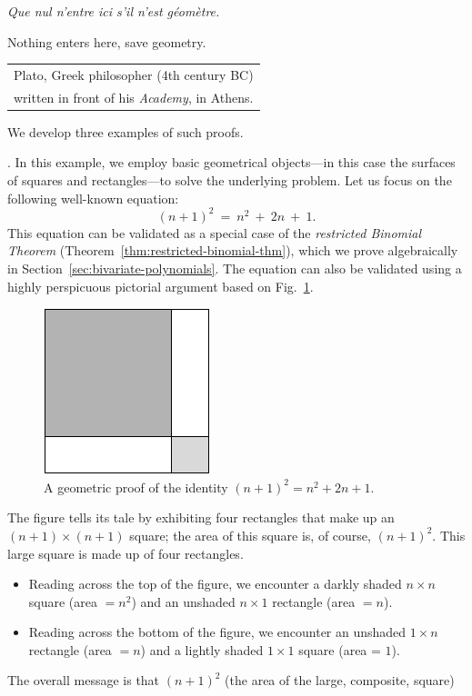 \medskip


{\it Que nul n'entre ici s'il n'est g\'eom\`etre.}

Nothing enters here, save geometry.

\hfill {\small \begin{tabular}{l}
Plato, Greek philosopher (4th century BC) \\
written in front of his \textit{Academy}, in Athens. 
\end{tabular} }

\medskip

\noindent
We develop three examples of such proofs.

\medskip

.
In this example, we employ basic geometrical objects---in this case the surfaces of squares and rectangles---to solve the underlying problem.  Let us focus on the following well-known equation:
\begin{equation}
(n+1)^2 \ = \ n^2 \ + \ 2n \ + \ 1.
\end{equation}
This equation can be validated as a special case of the {\em restricted Binomial Theorem}
(Theorem~\ref{thm:restricted-binomial-thm}), which we prove algebraically in Section~\ref{sec:bivariate-polynomials}.  The equation can also be validated using a highly perspicuous pictorial argument based on Fig.~\ref{fig:proofa2plusb2}.
\begin{figure}[ht]
\begin{center}
       \includegraphics[scale=0.4]{FiguresMaths/proofa2plusb2}
\caption{A geometric proof of the identity $(n+1)^2 = n^2 + 2n + 1$.}
       \label{fig:proofa2plusb2}
\end{center}
\end{figure}
The figure tells its tale by exhibiting four rectangles that make up an $(n+1) \times (n+1)$ square; the area of this square is, of course, $(n+1)^2$.  This large square is made up of four rectangles.
\begin{itemize}
\item
Reading across the top of the figure, we encounter a darkly shaded $n \times n$ square (area $= n^2$) and an unshaded $n \times 1$ rectangle (area $= n$).
\medskip\item
Reading across the bottom of the figure, we encounter an unshaded $1 \times n$ rectangle (area $= n$) and a lightly shaded $1 \times 1$ square (area = $1$).
\end{itemize}
The overall message is that $(n+1)^2$ (the area of the large, composite, square)

